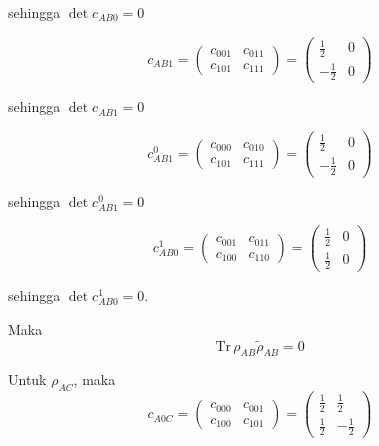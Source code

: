 \begin{enumerate}
	sehingga $\det c_{AB0} = 0$
	
	\begin{equation}
		c_{AB1}=
		\begin{pmatrix}
			c_{001} & c_{011} \\
			c_{101} & c_{111}
		\end{pmatrix}=
		\begin{pmatrix}
			\frac{1}{2} & 0 \\
			-\frac{1}{2} & 0
		\end{pmatrix}
	\end{equation}
	
	sehingga $\det c_{AB1} = 0$
	
	\begin{equation}
		c_{AB1}^0=
		\begin{pmatrix}
			c_{000} & c_{010} \\
			c_{101} & c_{111}
		\end{pmatrix}=
		\begin{pmatrix}
			\frac{1}{2} & 0 \\
			-\frac{1}{2} & 0
		\end{pmatrix}
	\end{equation}
	
	sehingga $\det c_{AB1}^0 = 0$
	
	\begin{equation}
		c_{AB0}^1=
		\begin{pmatrix}
			c_{001} & c_{011} \\
			c_{100} & c_{110}
		\end{pmatrix}=
		\begin{pmatrix}
			\frac{1}{2} & 0 \\
			\frac{1}{2} & 0
		\end{pmatrix}
	\end{equation}
	
	sehingga $\det c_{AB0}^1 = 0$.
	
	Maka
	\begin{equation}
		\mathrm{Tr}\,\rho_{AB}\tilde{\rho}_{AB}=0
	\end{equation}
	
	Untuk $\rho_{AC}$, maka
	\begin{equation}
		c_{A0C}=
		\begin{pmatrix}
			c_{000} & c_{001} \\
			c_{100} & c_{101}
		\end{pmatrix}=
		\begin{pmatrix}
			\frac{1}{2} & \frac{1}{2} \\
			\frac{1}{2} & -\frac{1}{2}
		\end{pmatrix}
	\end{equation}
	

\end{enumerate}
